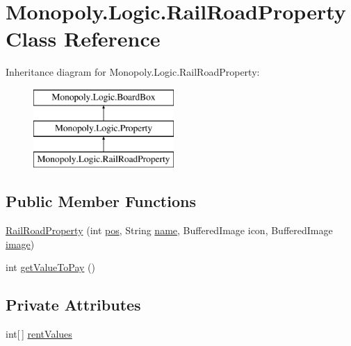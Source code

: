 \hypertarget{class_monopoly_1_1_logic_1_1_rail_road_property}{}\section{Monopoly.\+Logic.\+Rail\+Road\+Property Class Reference}
\label{class_monopoly_1_1_logic_1_1_rail_road_property}
Inheritance diagram for Monopoly.\+Logic.\+Rail\+Road\+Property\+:\begin{figure}[H]
\begin{center}
\leavevmode
\includegraphics[height=3.000000cm]{class_monopoly_1_1_logic_1_1_rail_road_property}
\end{center}
\end{figure}
\subsection*{Public Member Functions}
\begin{DoxyCompactItemize}
\item 
\hyperlink{class_monopoly_1_1_logic_1_1_rail_road_property_a7bcb4b7cf18ff4db7ffb3eece773e97e}{Rail\+Road\+Property} (int \hyperlink{class_monopoly_1_1_logic_1_1_board_box_a750c8300a134809e0eb5772b3ba92258}{pos}, String \hyperlink{class_monopoly_1_1_logic_1_1_board_box_ad5cd8d9fc191dc2df82b9fe7766210fd}{name}, Buffered\+Image icon, Buffered\+Image \hyperlink{class_monopoly_1_1_logic_1_1_property_a1bd3d29f02147192157c57535fd0eca9}{image})
\item 
int \hyperlink{class_monopoly_1_1_logic_1_1_rail_road_property_a172242d8e6f78379a45b51e52cadc2c1}{get\+Value\+To\+Pay} ()
\end{DoxyCompactItemize}
\subsection*{Private Attributes}
\begin{DoxyCompactItemize}
\item 
int\mbox{[}$\,$\mbox{]} \hyperlink{class_monopoly_1_1_logic_1_1_rail_road_property_ac317b2995b89204a5ec89dabd7bcef6e}{rent\+Values}
\end{DoxyCompactItemize}
